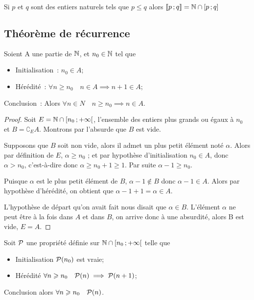  Si \(p\) et \(q\) sont des entiers naturels tels que \(p\leqslant q\) alors \(\intervalleentier{p}{q}= \N\cap\intervalleff{p}{q}\) 

\subsection{Théorème de récurrence}

\begin{theo}
  \label{theo:rec}
  Soient A une partie de \(\N\), et \(n_0\in\N\) tel que
  \begin{itemize}
  \item Initialisation~: \(n_0\in A\);
  \item Hérédité~: \(\forall n\geqslant n_0 \quad n\in A \implies n+1\in A\);
  \end{itemize}
  Conclusion~: Alors \(\forall n \in N \quad n\geqslant n_0 \implies n \in A\).
\end{theo}
\begin{proof}
  Soit \(E=\N\cap \intervallefo{n_0}{+\infty}\), l'ensemble des entiers plus grands ou égaux à \(n_0\) et \(B=\complement_E A\). Montrons par l'absurde que \(B\) est vide. 

Supposons que \(B\) soit non vide, alors il admet un plus petit élément noté \(\alpha\). Alors par définition de \(E\), \(\alpha\geqslant n_0\) ; et par hypothèse d'initialisation \(n_0\in A\), donc \(\alpha > n_0\), c'est-à-dire donc \(\alpha\geqslant n_0+1\geqslant 1\). Par suite \(\alpha-1\geqslant n_0\). 

Puisque \(\alpha\) est le plus petit élément de \(B\), \(\alpha-1 \notin B\) donc \(\alpha-1 \in A\). Alors par hypothèse d'hérédité, on obtient que \(\alpha-1+1=\alpha\in A\). 

L'hypothèse de départ qu'on avait fait nous disait que \(\alpha \in B\). L'élément \(\alpha\) ne peut être à la fois dans \(A\) et dans \(B\), on arrive donc à une absurdité, alors B est vide, \(E=A\).
\end{proof}
\begin{cor}
  \label{cor:recsimple}
  Soit \(\P\) une propriété définie sur \(\N\cap \intervallefo{n_0}{+\infty}\) telle que
  \begin{itemize}
  \item Initialisation \(\P(n_0)\) est vraie;
  \item Hérédité \(\forall n\geqslant n_0 \quad \P(n) \implies \P(n+1)\);
  \end{itemize}
  Conclusion alors \(\forall n\geqslant n_0 \quad \P(n)\).
\end{cor}
